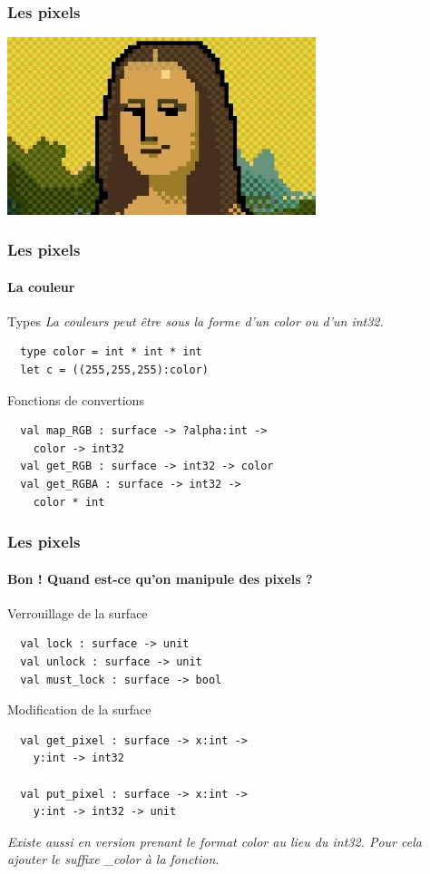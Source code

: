 \begin{frame}
	\frametitle{Les pixels}
	\begin{center}
		\includegraphics[width=9cm]{pics/Joconde-pixel.jpg}
	\end{center}
\end{frame}

\begin{frame}[fragile]
	\frametitle{Les pixels}
	\framesubtitle{La couleur}
	\begin{block}{Types}
		\textit{La couleurs peut être sous la forme d'un color ou d'un int32.}
		\begin{lstlisting}
  type color = int * int * int
  let c = ((255,255,255):color)
		\end{lstlisting}
	\end{block}
	\begin{block}{Fonctions de convertions}
		\begin{lstlisting}
  val map_RGB : surface -> ?alpha:int -> 
    color -> int32
  val get_RGB : surface -> int32 -> color
  val get_RGBA : surface -> int32 -> 
    color * int
		\end{lstlisting}
	\end{block}
\end{frame}

\begin{frame}[fragile]
	\frametitle{Les pixels}
	\framesubtitle{\og{}Bon ! Quand est-ce qu'on manipule des pixels ?\fg}
	\begin{block}{Verrouillage de la surface}
		\begin{lstlisting}
  val lock : surface -> unit
  val unlock : surface -> unit
  val must_lock : surface -> bool
		\end{lstlisting}
	\end{block}
	\begin{block}{Modification de la surface}
		\begin{lstlisting}
  val get_pixel : surface -> x:int -> 
    y:int -> int32

  val put_pixel : surface -> x:int -> 
    y:int -> int32 -> unit
		\end{lstlisting}
		\textit{Existe aussi en version prenant le format color au lieu du int32. Pour cela ajouter le suffixe \_color à la fonction.}
	\end{block}
\end{frame}

